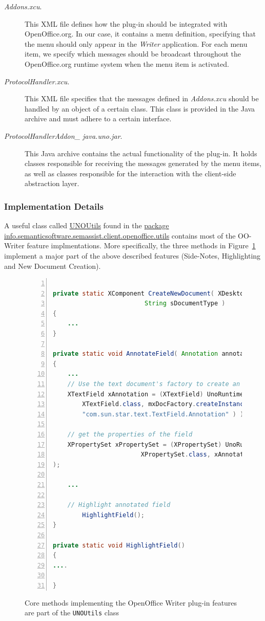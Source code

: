 \begin{description}
\item[\emph{Addons.xcu}.] This XML file defines how the plug-in should
  be integrated with OpenOffice.org. In our case, it contains a menu
  definition, specifying that the menu should only appear in the
  \emph{Writer} application. For each menu item, we specify which
  messages should be broadcast throughout the OpenOffice.org runtime
  system when the menu item is activated.
\item[\emph{ProtocolHandler.xcu}. ] This XML file specifies that the
  messages defined in \emph{Addons.xcu} should be handled by an object
  of a certain class. This class is provided in the Java archive and
  must adhere to a certain interface. 
\item[\emph{ProtocolHandlerAddon\_ java.uno.jar}.] This Java archive
  contains the actual functionality of the plug-in. It holds classes
  responsible for receiving the messages generated by the menu items,
  as well as classes responsible for the interaction with the
  client-side abstraction layer.
\end{description}


\subsubsection{Implementation Details}
A useful class called \url{UNOUtils} found in the \url{package
  info.semanticsoftware.semassist.client.openoffice.utils} contains most of
the OO-Writer feature implmentations.  More specifically, the three methods in
Figure~\ref{list:ssb} implement a major part of the above described features
(Side-Notes, Highlighting and New Document Creation).

\begin{figure}
\centering
\begin{lstlisting}[language=Java,numbers=left,xleftmargin=8mm,columns=flexible]

private static XComponent CreateNewDocument( XDesktop xDesktop, 
					     String sDocumentType )
{
	...
}

private static void AnnotateField( Annotation annotation )
{
	...
	// Use the text document's factory to create an Annotation text field
	XTextField xAnnotation = (XTextField) UnoRuntime.queryInterface(
		XTextField.class, mxDocFactory.createInstance(
		"com.sun.star.text.TextField.Annotation" ) );
	
	// get the properties of the field
	XPropertySet xPropertySet = (XPropertySet) UnoRuntime.queryInterface( 
						XPropertySet.class, xAnnotation
);
	
	...
	
	// Highlight annotated field
        HighlightField();
}

private static void HighlightField()
{
....

}
\end{lstlisting}
\caption{Core methods implementing the OpenOffice Writer plug-in features are
  part of the \texttt{UNOUtils} class}
\label{list:ssb}
\end{figure}


